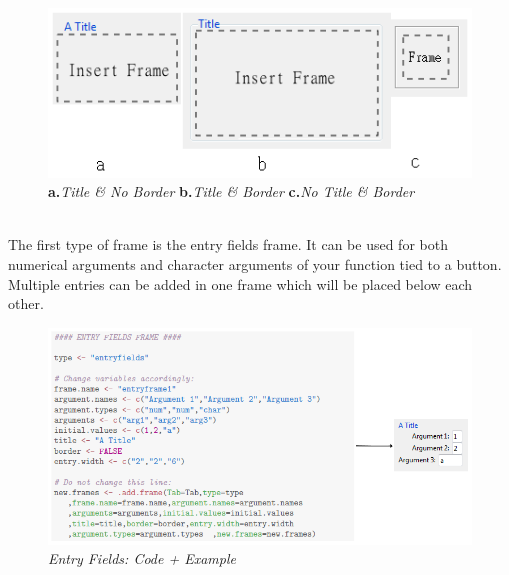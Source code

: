 \documentclass[a4paper]{article}\usepackage[]{graphicx}\usepackage[]{color}
\begin{document}
\begin{figure}[H]
\centering
\includegraphics[scale=0.5]{figures/title_border.png}
\caption{{\bf a.}{\it Title \& No Border} {\bf b.}{\it Title \& Border} {\bf
c.}{\it No Title \& Border}
\label{titleborder}}
\end{figure}


\\
\noindent The first type of frame is the entry fields frame. It can be used for
both numerical arguments and character arguments of your function tied to a
button. Multiple entries can be added in one frame which will be placed below
each other.
\begin{figure}[H]
\centering
\includegraphics[scale=0.5]{figures/entryfields.png}
\caption{{\it Entry Fields: Code + Example}
\label{entryfields}}
\end{figure}
\end{document}
